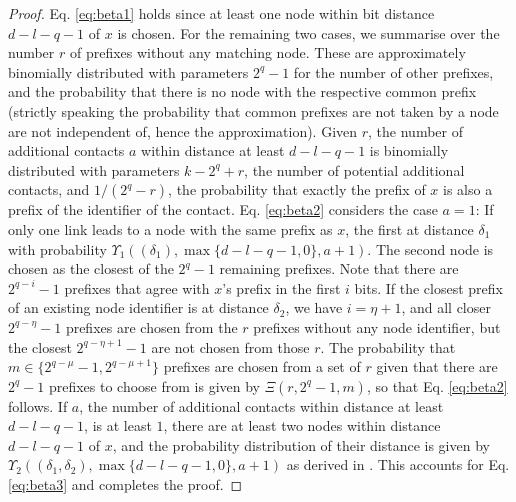 \documentclass[10pt, conference, compsocconf, letterpaper]{IEEEtran}
\renewcommand{\over}{\Xi}
\newcommand{\best}{\Upsilon}
\begin{document}
\begin{proof}
Eq. \ref{eq:beta1} holds since at least one node within bit distance $d-l-q-1$ of
$x$ is chosen.
For the remaining two cases, we summarise over the number $r$ of prefixes
without any matching node. These are approximately binomially distributed with parameters $2^q-1$ for the number of other prefixes, and the probability
that there is no node with the respective common prefix (strictly speaking the
probability that common prefixes are not taken by a node are not independent of,
hence the approximation).
Given $r$, the number of additional contacts $a$ within distance at least
$d-l-q-1$ is binomially distributed with parameters $k-2^q+r$, the number
of potential additional contacts, and $1/(2^q-r)$, the probability that exactly
the prefix of $x$ is also a prefix of the identifier of the contact.
Eq. \ref{eq:beta2} considers the case $a=1$: 
If only one link leads to a node with the same prefix as $x$, the 
first at distance $\delta_1$ with probability $\best_1((\delta_1),\max\{d-l-q-1,0\},a+1)$. 
The second node is chosen as the closest of the $2^q-1$ remaining prefixes. Note that there are $2^{q-i}-1$ prefixes that agree with $x$'s
prefix in the first $i$ bits. 
If the closest prefix of an existing node identifier is at distance $\delta_2$, we have
$i=\eta+1$, and all closer $2^{q-\eta}-1$ prefixes are chosen from the $r$ prefixes
without any node identifier, but the closest $2^{q-\eta+1}-1$ are not chosen from
those $r$.  The probability that $m \in \{2^{q-\mu}-1, 2^{q-\mu+1}\}$ prefixes are chosen from a set of $r$
given that there are $2^q-1$ prefixes to choose from is given by
$\over(r,2^q-1,m)$, so that Eq. \ref{eq:beta2} follows.
If $a$, the number of additional contacts within distance at least $d-l-q-1$, is at least $1$, there are at least two nodes within distance $d-l-q-1$ of $x$,
and the probability distribution of their distance is given by 
$\best_2((\delta_1,\delta_2),\max\{d-l-q-1,0\},a+1)$ as derived in \cite{roos13comprehending}.
This accounts for Eq. \ref{eq:beta3} and completes the proof.\end{proof}
\end{document}
